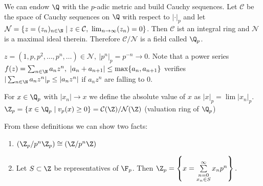 \documentclass{jvfscript}
\begin{document}
	We can endow $\Q$ with the $p$-adic metric and build Cauchy sequences. Let $\mathcal{C}$ be the space of Cauchy sequences on $\Q$ with respect to $|\cdot|_p$ and let $\mathcal{N} = \{z = (z_n)_{n \in \N} \mid z \in \mathcal{C},\ \lim_{n \to \infty}(z_n) = 0\}$. Then $\mathcal{C}$ ist an integral ring and $\mathcal{N}$ is a maximal ideal therein. Therefore $\mathcal{C}/\mathcal{N}$ is a field called $\Q_p$.
	
	\begin{exmp}
		$z = (1,p,p^2,\dotsc,p^n,\dotsc) \in \mathcal{N},\ |p^n|_p = p^{-n} \to 0$. Note that a power series $ f(z) = \sum_{n \in \N} a_n z^n,\ |a_n + a_{n+1}| \leq \max\{a_n,a_{n+1}\} $ verifies $ |\sum_{n \in \N} a_nz^n|_p \leq |a_nz^n| $ if $ a_nz^n $ are falling to 0.
	\end{exmp}

	\begin{defn}[Limits in $\Q_p$]
		For $ x \in \Q_p $ with $|x_n| \to x$ we define the absolute value of $x$ as $ |x|_p = \lim|x_n|_p $. \\
		$ \Z_p = \{x \in \Q_p \mid v_p(x) \geq 0\} = \mathcal{C}(\Z)/\mathcal{N}(\Z) $ (valuation ring of $\Q_p$)
	\end{defn}	
	From these definitions we can show two facts:
	\begin{enumerate}[label = {\roman*})]
		\item $ \left( \Z_p/p^n\Z_p \right) \cong \left( \Z/p^n\Z \right) $
		\item Let $ S \subset \Z $ be representatives of $ \F_p $. Then $ \Z_p = \left\{ x = \sum\limits_{\substack{n=0\\x_n \in S}}^\infty x_n p^n \right\}. $ 
	\end{enumerate}
	
\end{document}
